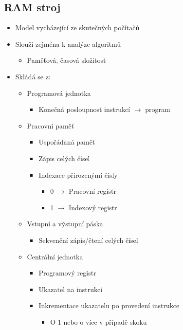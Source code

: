 \documentclass[openany]{book}
\begin{document}
\subsection{RAM stroj}
\begin{itemize}
    \item Model vycházející ze skutečných počítačů
    \item Slouží zejména k analýze algoritmů
    \begin{itemize}
        \item Paměťová, časová složitost
    \end{itemize}
    \item Skládá se z:
    \begin{itemize}
        \item Programová jednotka
        \begin{itemize}
            \item Konečná posloupnost instrukcí \(\rightarrow\) program
        \end{itemize}
        \item Pracovní paměť
        \begin{itemize}
            \item Uspořádaná paměť
            \item Zápis celých čísel
            \item Indexace přirozenými čísly
            \begin{itemize}
                \item 0 \(\rightarrow\) Pracovní registr
                \item 1 \(\rightarrow\) Indexový registr
            \end{itemize}
        \end{itemize}
        \item Vstupní a výstupní páska
        \begin{itemize}
            \item Sekvenční zápis/čtení celých čísel
        \end{itemize}
        \item Centrální jednotka
        \begin{itemize}
            \item Programový registr
            \item Ukazatel na instrukci
            \item Inkrementace ukazatelu po provedení instrukce
            \begin{itemize}
                \item O 1 nebo o více v případě skoku
            \end{itemize}
        \end{itemize}
    \end{itemize}
\end{itemize}
\end{document}
